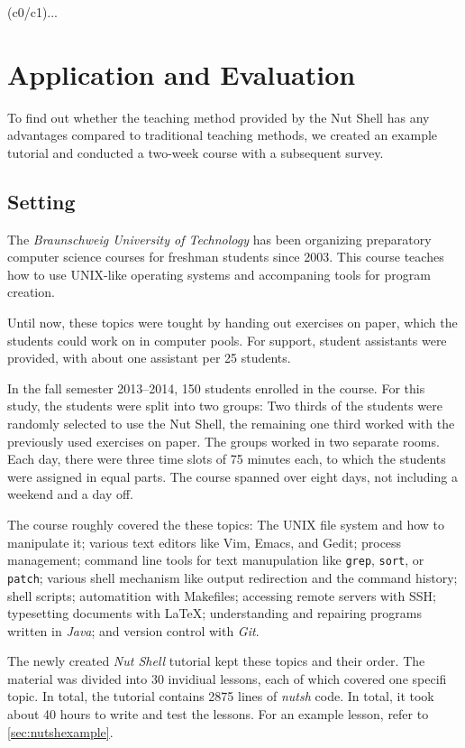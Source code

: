 \documentclass[paper=a4,twoside,abstract=on,cleardoublepage=empty,numbers=noenddot,toc=bib,11pt,appendixprefix=true]{scrreprt}
\begin{document}
(c0/c1)...

\chapter{Application and Evaluation}
\label{sec:evaluation}

To find out whether the teaching method provided by the Nut Shell has any advantages compared to traditional teaching methods, we created an example tutorial and conducted a two-week course with a subsequent survey.

\section{Setting}

The \textit{Braunschweig University of Technology} has been organizing preparatory computer science courses for freshman students since 2003. This course teaches how to use UNIX-like operating systems and accompaning tools for program creation.

Until now, these topics were tought by handing out exercises on paper, which the students could work on in computer pools. For support, student assistants were provided, with about one assistant per 25 students.

In the fall semester 2013--2014, 150 students enrolled in the course. For this study, the students were split into two groups: Two thirds of the students were randomly selected to use the Nut Shell, the remaining one third worked with the previously used exercises on paper. The groups worked in two separate rooms. Each day, there were three time slots of 75 minutes each, to which the students were assigned in equal parts. The course spanned over eight days, not including a weekend and a day off.

The course roughly covered the these topics: The \textsc{UNIX} file system and how to manipulate it; various text editors like Vim, Emacs, and Gedit; process management; command line tools for text manupulation like \texttt{grep}, \texttt{sort}, or \texttt{patch}; various shell mechanism like output redirection and the command history; shell scripts; automatition with Makefiles; accessing remote servers with \textsc{SSH}; typesetting documents with \LaTeX; understanding and repairing programs written in \textit{Java}; and version control with \textit{Git}.

The newly created \textit{Nut Shell} tutorial kept these topics and their order. The material was divided into 30 invidiual lessons, each of which covered one specifi topic. In total, the tutorial contains 2875 lines of \textit{nutsh} code. In total, it took about 40 hours to write and test the lessons. For an example lesson, refer to \cref{sec:nutshexample}.
\end{document}

